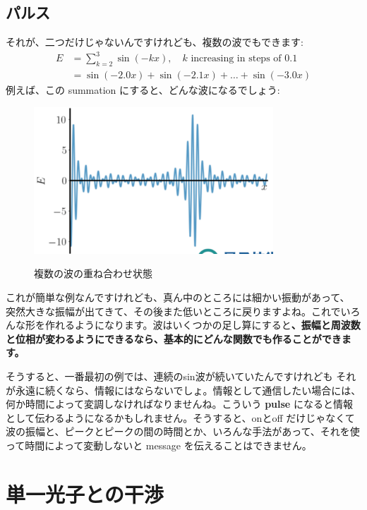 \subsection{パルス}
それが、二つだけじゃないんですけれども、複数の波でもできます:
\begin{equation}
\begin{aligned}
E &=\sum_{k=2}^{3} \sin (-k x), \quad k \text { increasing in steps of } 0.1 \\
&=\sin (-2.0 x)+\sin (-2.1 x)+\ldots+\sin (-3.0 x)
\end{aligned}
\end{equation}
例えば、この summation にすると、どんな波になるでしょう:
\begin{figure}[H]
   \centering
    \includegraphics[width=0.8\textwidth]{lesson6/pulse.pdf}
    \label{fig: 1}
    \begin{center}
        \caption{複数の波の重ね合わせ状態}
    \end{center}
\end{figure}
これが簡単な例なんですけれども、真ん中のところには細かい振動があって、
突然大きな振幅が出てきて、その後また低いところに戻りますよね。これでいろんな形を作れるようになります。波はいくつかの足し算にすると\textbf{、振幅と周波数と位相が変わるようにできるなら、基本的にどんな関数でも作ることができます。}

そうすると、一番最初の例では、連続のsin波が続いていたんですけれども
それが永遠に続くなら、情報にはならないでしょ。情報として通信したい場合には、何か時間によって変調しなければなりませんね。こういう \textbf{pulse} になると情報として伝わるようになるかもしれません。そうすると、onとoff だけじゃなくて波の振幅と、ピークとピークの間の時間とか、いろんな手法があって、それを使って時間によって変動しないと message を伝えることはできません。



\section{単一光子との干渉}
